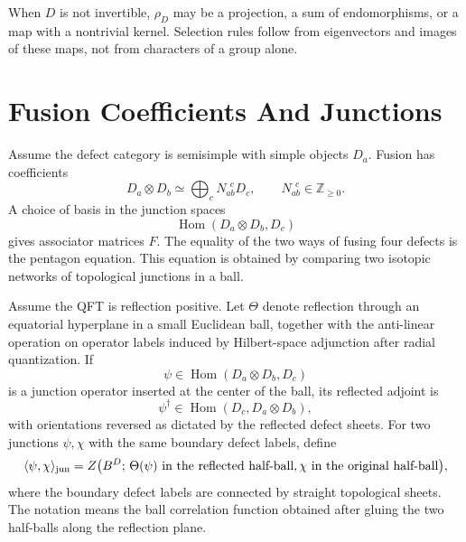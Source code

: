 When \(D\) is not invertible, \(\rho_D\) may be a projection, a sum of
endomorphisms, or a map with a nontrivial kernel.  Selection rules follow from
eigenvectors and images of these maps, not from characters of a group alone.

\section{Fusion Coefficients And Junctions}

Assume the defect category is semisimple with simple objects \(D_a\).  Fusion
has coefficients
\[
  D_a\otimes D_b\simeq \bigoplus_c N_{ab}^{\ \ c}D_c,
  \qquad N_{ab}^{\ \ c}\in\mathbb Z_{\ge0}.
\]
A choice of basis in the junction spaces
\[
  \operatorname{Hom}(D_a\otimes D_b,D_c)
\]
gives associator matrices \(F\).  The equality of the two ways of fusing four
defects is the pentagon equation.  This equation is obtained by comparing two
isotopic networks of topological junctions in a ball.

\begin{definition}
\label{def:adjoint-junction-reflection-pairing}
Assume the QFT is reflection positive.  Let
\(\Theta\) denote reflection through an equatorial hyperplane in a small
Euclidean ball, together with the anti-linear operation on operator labels
induced by Hilbert-space adjunction after radial quantization.  If
\[
  \psi\in\operatorname{Hom}(D_a\otimes D_b,D_c)
\]
is a junction operator inserted at the center of the ball, its reflected
adjoint is
\begin{equation}
  \psi^\dagger\in\operatorname{Hom}(D_c,D_a\otimes D_b),
  \label{eq:defect-junction-adjoint}
\end{equation}
with orientations reversed as dictated by the reflected defect sheets.  For
two junctions \(\psi,\chi\) with the same boundary defect labels, define
\begin{equation}
  \langle\psi,\chi\rangle_{\rm jun}
  =
  Z\bigl(B^D;\,\Theta(\psi)\ \text{in the reflected half-ball},
  \chi\ \text{in the original half-ball}\bigr),
  \label{eq:junction-reflection-pairing}
\end{equation}
where the boundary defect labels are connected by straight topological
sheets.  The notation means the ball correlation function obtained after
gluing the two half-balls along the reflection plane.
\end{definition}

